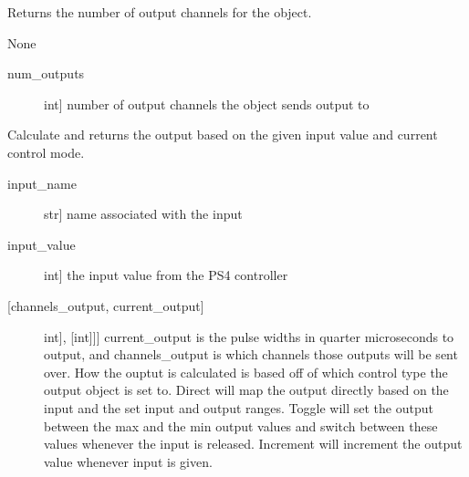 \documentclass[letterpaper,10pt,english]{sphinxmanual}
\begin{document}
\begin{fulllineitems}
\begin{fulllineitems}
\label{\detokenize{specific:EarOutput.EarOutput.get_num_channels}}
\sphinxAtStartPar
Returns the number of output channels for the object.

\sphinxAtStartPar
{}

\sphinxAtStartPar
None

\sphinxAtStartPar
{}
\begin{description}
\item[{num\_outputs}] \leavevmode{[}int{]}
\sphinxAtStartPar
number of output channels the object sends output to

\end{description}

\end{fulllineitems}


\begin{fulllineitems}
\label{\detokenize{specific:EarOutput.EarOutput.get_output}}
\sphinxAtStartPar
Calculate and returns the output based on the given input value and current control mode.

\sphinxAtStartPar
{}
\begin{description}
\item[{input\_name}] \leavevmode{[}str{]}
\sphinxAtStartPar
name associated with the input

\item[{input\_value}] \leavevmode{[}int{]}
\sphinxAtStartPar
the input value from the PS4 controller

\end{description}

\sphinxAtStartPar
{}
\begin{description}
\item[{{[}channels\_output, current\_output{]}}] \leavevmode{[}{[}{[}int{]}, {[}int{]}{]}{]}
\sphinxAtStartPar
current\_output is the pulse widths in quarter microseconds to output, and channels\_output
is which channels those outputs will be sent over. How the ouptut is calculated is based
off of which control type the output object is set to. Direct will map the output directly
based on the input and the set input and output ranges. Toggle will set the output between
the max and the min output values and switch between these values whenever the input is
released. Increment will increment the output value whenever input is given.


\end{description}
\end{fulllineitems}
\end{fulllineitems}
\end{document}
